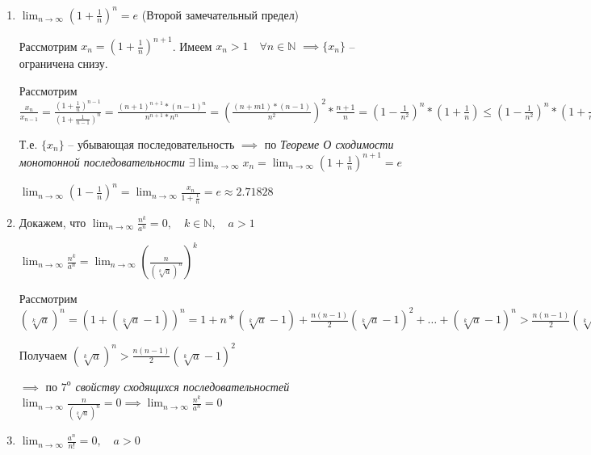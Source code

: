 \documentclass[a4paper,oneside]{article}
\newcommand{\dslim}{\displaystyle\lim}
\newcommand{\dslimn}{\dslim_{n \to \infty}}
\theoremstyle{definition}
\theoremstyle{definition}
\theoremstyle{definition}
\begin{document}
\begin{enumerate}
    \item 
        $\displaystyle \lim_{n \to \infty} \left( 1 + \frac{1}{n} \right)^n = e$ (Второй замечательный предел)
        
        Рассмотрим $x_n = \left( 1 + \frac{1}{n} \right)^{n + 1}$. 
        Имеем $x_n > 1 \quad \forall n \in \mathbb{N}$ $\implies \{x_n\}$ -- ограничена снизу.

        Рассмотрим $\frac{x_n}{x_{n-1}} = 
        \frac{\left( 1 + \frac{1}{n} \right)^{n - 1}}{\left( 1 + \frac{1}{n - 1} \right)^{n}}
        = \frac{(n + 1)^{n+1} * (n - 1)^n}{n^{n+1} * n^n}
        = \left( \frac{(n + m1) * (n - 1)}{n^2} \right)^2 * \frac{n + 1}{n}
        = \left( 1 - \frac{1}{n^2} \right)^{n} * \left( 1 + \frac{1}{n} \right)
        \le \left( 1 - \frac{1}{n^2} \right)^{n} * \left( 1 + \frac{1}{n^2} \right)^n
        \le \left( 1 - \frac{1}{n^4} \right)^{n} < 1 \implies x_n < x_{n-1}$

        Т.е. $\{x_n\}$ -- убывающая последовательность $\implies$
        по \textit{Теореме О сходимости монотонной последовательности}
        $\exists \dslimn x_n = 
        \dslimn \left( 1 + \frac{1}{n} \right)^{n + 1} = e$

        $\dslimn \left( 1 - \frac{1}{n} \right)^{n}
        = \dslimn \frac{x_n}{1 + \frac{1}{n}} = e \approx 2.71828$


    \item 
        Докажем, что $\dslimn \frac{n^k}{a^n} = 0,
        \quad k \in \mathbb{N}, \quad a > 1$

        $\dslimn \frac{n^k}{a^n} = 
        \dslimn \left( \frac{n}{(\sqrt[k]{a})^n} \right)^k$

        Рассмотрим $(\sqrt[k]{a})^n = (1 + (\sqrt[k]{a} - 1)) ^ n = 
        1 + n * (\sqrt[k]{a} - 1) + \frac{n (n - 1)}{2} (\sqrt[k]{a} - 1)^2
        + \dots + (\sqrt[k]{a} - 1)^n > \frac{n (n - 1)}{2} (\sqrt[k]{a} - 1)^2$

        Получаем $(\sqrt[k]{a})^n > \frac{n (n - 1)}{2} (\sqrt[k]{a} - 1)^2$

        $\implies$ по \textit{$7^{\text{о}}$ свойству сходящихся последовательностей}
        $\dslimn \frac{n}{(\sqrt[k]{a})^n} = 0
        \implies \dslimn \frac{n^k}{a^n} = 0$


    \item 
        $\dslimn \frac{a^n}{n!} = 0, \quad a > 0$


\end{enumerate}
\end{document}

